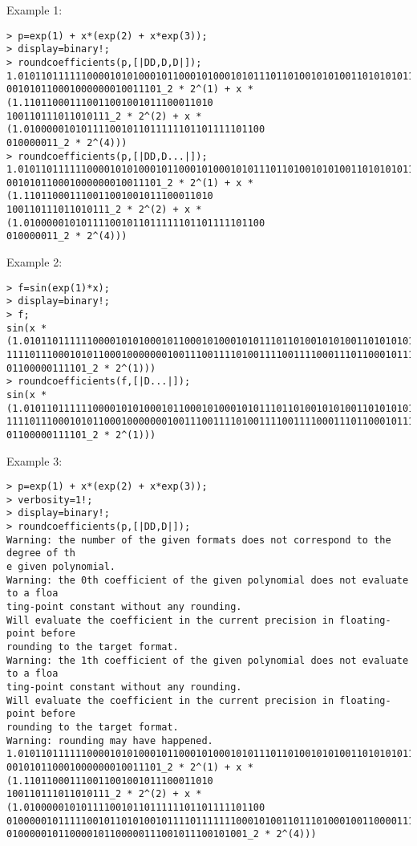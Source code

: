 \noindent Example 1: 
\begin{center}\begin{minipage}{15cm}\begin{Verbatim}[frame=single]
> p=exp(1) + x*(exp(2) + x*exp(3));
> display=binary!;
> roundcoefficients(p,[|DD,D,D|]);
1.010110111111000010101000101100010100010101110110100101010011010101011111101110
001010110001000000010011101_2 * 2^(1) + x * (1.110110001110011001001011100011010
100110111011010111_2 * 2^(2) + x * (1.010000010101111001011011111101101111101100
010000011_2 * 2^(4)))
> roundcoefficients(p,[|DD,D...|]);
1.010110111111000010101000101100010100010101110110100101010011010101011111101110
001010110001000000010011101_2 * 2^(1) + x * (1.110110001110011001001011100011010
100110111011010111_2 * 2^(2) + x * (1.010000010101111001011011111101101111101100
010000011_2 * 2^(4)))
\end{Verbatim}
\end{minipage}\end{center}
\noindent Example 2: 
\begin{center}\begin{minipage}{15cm}\begin{Verbatim}[frame=single]
> f=sin(exp(1)*x);
> display=binary!;
> f;
sin(x * (1.010110111111000010101000101100010100010101110110100101010011010101011
11110111000101011000100000001001110011110100111100111100011101100010111001110001
01100000111101_2 * 2^(1)))
> roundcoefficients(f,[|D...|]);
sin(x * (1.010110111111000010101000101100010100010101110110100101010011010101011
11110111000101011000100000001001110011110100111100111100011101100010111001110001
01100000111101_2 * 2^(1)))
\end{Verbatim}
\end{minipage}\end{center}
\noindent Example 3: 
\begin{center}\begin{minipage}{15cm}\begin{Verbatim}[frame=single]
> p=exp(1) + x*(exp(2) + x*exp(3));
> verbosity=1!;
> display=binary!;
> roundcoefficients(p,[|DD,D|]);
Warning: the number of the given formats does not correspond to the degree of th
e given polynomial.
Warning: the 0th coefficient of the given polynomial does not evaluate to a floa
ting-point constant without any rounding.
Will evaluate the coefficient in the current precision in floating-point before 
rounding to the target format.
Warning: the 1th coefficient of the given polynomial does not evaluate to a floa
ting-point constant without any rounding.
Will evaluate the coefficient in the current precision in floating-point before 
rounding to the target format.
Warning: rounding may have happened.
1.010110111111000010101000101100010100010101110110100101010011010101011111101110
001010110001000000010011101_2 * 2^(1) + x * (1.110110001110011001001011100011010
100110111011010111_2 * 2^(2) + x * (1.010000010101111001011011111101101111101100
01000001011111001011010100101111011111110001010011011101000100110000111010001110
010000010110000101100000111001011100101001_2 * 2^(4)))
\end{Verbatim}
\end{minipage}\end{center}
